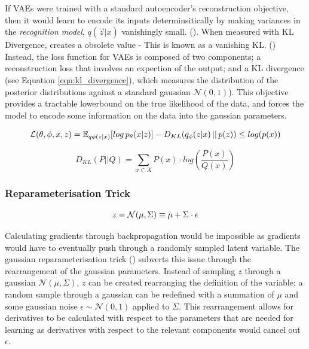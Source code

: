 \documentclass[12pt,twoside]{report}
\begin{document}
If VAEs were trained with a standard autoencoder's reconstruction objective, then it would learn to encode its inputs determinsitically by making variances in the \textit{recognition model}, $q(\overrightarrow{z}|x)$ vanishingly small. (\cite{raiko_techniques_2014}). When measured with KL Divergence, creates a obsolete value - This is known as a vanishing KL. (\cite{fu*_cyclical_2019}) Instead, the loss function for VAEs is composed of two components; a reconstruction loss that involves an expection of the output; and a KL divergence (see Equation \ref{eqn:kl_divergence}), which measures the distribution of the posterior distributions against a standard gaussian $ \mathcal{N}(0,1)$). This objective provides a tractable lowerbound on the true likelihood of the data, and forces the model to encode some information on the data into the gaussian parameters.
  
\begin{equation}
	\label{eqn:elbo}
	\mathcal{L}(\theta, \phi, x, z) = \mathbb{E}_{q \phi (z|x)}[log \thinspace p_{\theta}(x|z)] - D_{KL}(q_{\phi}(z|x)\thinspace||\thinspace p(z)) \leq log (p(x))
\end{equation}

\begin{equation}
	\label{eqn:kl_divergence}
D_{KL}(P ||Q) = \sum_{x \subset X} P(x) \cdot log (\frac{P(x)}{Q(x)})
\end{equation}


\subsubsection*{Reparameterisation Trick}
\label{reparam_trick}
\begin{equation}
	z = \mathcal{N}(\mu, \Sigma) \equiv \mu + \Sigma \cdot \epsilon \\
	\label{eqn:reparam}
\end{equation}

Calculating gradients through backpropagation would be impossible as gradients would have to eventually push through a randomly sampled latent variable. The gaussian reparameterisation trick (\cite{kingma_auto-encoding_2013}) subverts this issue through the rearrangement of the gaussian parameters. Instead of sampling $z$ through a gaussian $\mathcal{N}(\mu, \Sigma)$, $z$ can be created rearranging the definition of the variable; a random sample through a gaussian can be redefined with a summation of $\mu$ and some gaussian noise $\epsilon \sim \mathcal{N}(0,1)$ applied to $\Sigma$. This rearrangement allows for derivatives to be calculated with respect to the parameters that are needed for learning as derivatives with respect to the relevant components would cancel out $\epsilon$.
\end{document}
